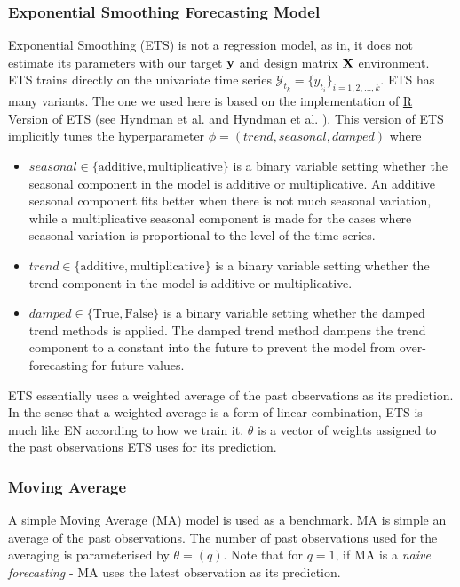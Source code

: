 \subsubsection{Exponential Smoothing Forecasting Model}
Exponential Smoothing (ETS) is not a regression model, as in, it does not estimate its parameters with our target $\mathbf{y}$ and design matrix $\mathbf{X}$ environment. ETS trains directly on the univariate time series $\mathcal{Y}_{t_k} = \{ y_{t_i}\}_{i = 1, 2, \ldots, k}$. ETS has many variants. The one we used here is based on the implementation of \href{https://www.rdocumentation.org/packages/forecast/versions/8.12/topics/ets}{R Version of ETS} (see Hyndman et al. \citeyear{hyndman2008admissible} and Hyndman et al. \citeyear{hyndman2008forecasting}). This version of ETS implicitly tunes the hyperparameter $\phi = (trend, seasonal, damped)$ where
\begin{itemize}
    \item $seasonal \in \{ \text{additive}, \text{multiplicative} \}$ is a binary variable setting whether the seasonal component in the model is additive or multiplicative. An additive seasonal component fits better when there is not much seasonal variation, while a multiplicative seasonal component is made for the cases where seasonal variation is proportional to the level of the time series.
    \item $trend \in \{ \text{additive}, \text{multiplicative} \}$ is a binary variable setting whether the trend component in the model is additive or multiplicative.
    \item $damped \in \{ \text{True}, \text{False} \}$ is a binary variable setting whether the damped trend methods is applied. The damped trend method dampens the trend component to a constant into the future to prevent the model from over-forecasting for future values.
\end{itemize}
ETS essentially uses a weighted average of the past observations as its prediction. In the sense that a weighted average is a form of linear combination, ETS is much like EN according to how we train it. $\theta$ is a vector of weights assigned to the past observations ETS uses for its prediction.

\subsubsection{Moving Average}
A simple Moving Average (MA) model is used as a benchmark. MA is simple an average of the past observations. The number of past observations used for the averaging is parameterised by $\theta = (q)$. Note that for $q = 1$, if MA is a \textit{naive forecasting} - MA uses the latest observation as its prediction.


